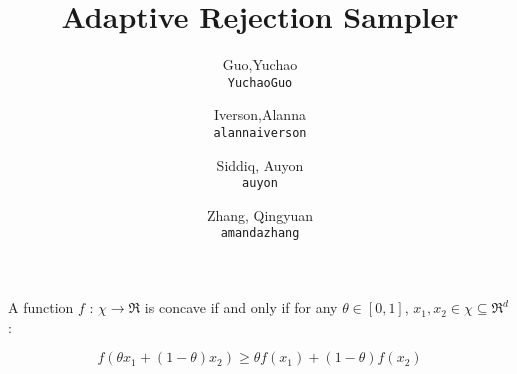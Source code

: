 \documentclass[11pt]{article}
\title{Adaptive Rejection Sampler}
\author{
  Guo,Yuchao\\
  \texttt{YuchaoGuo}
  \and
  Iverson,Alanna\\
  \texttt{alannaiverson}
  \and
  Siddiq, Auyon\\
  \texttt{auyon}
  \and
  Zhang, Qingyuan\\
  \texttt{amandazhang}
}
\begin{document}
 

\maketitle




A function $f$ : $\chi \rightarrow \Re$ is concave if and only if for any
$\theta \in [0,1]$, $x_1, x_2 \in \chi \subseteq \Re^{d}$ : \par 
$$f(\theta x_1 + (1-\theta ) x_2) \geq \theta f(x_1) + (1-\theta)f(x_2)$$



\end{document}
